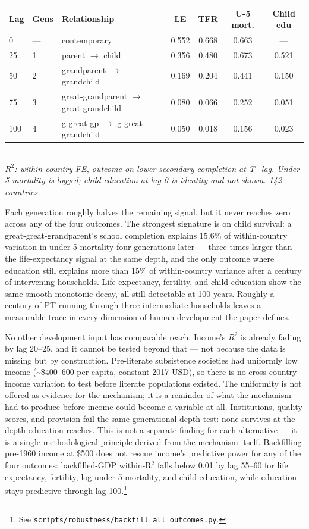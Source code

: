 \documentclass[12pt,letterpaper]{article}
\begin{document}
\begin{center}
\footnotesize
\begin{tabular}{@{}llp{4.4cm}cccc@{}}
\toprule
Lag & Gens & Relationship & LE & TFR & U-5 mort. & Child edu \\
\midrule
0   & ---  & contemporary                                 & 0.552 & 0.668 & 0.663 & --- \\
25  & 1    & parent $\to$ child                           & 0.356 & 0.480 & 0.673 & 0.521 \\
50  & 2    & grandparent $\to$ grandchild                 & 0.169 & 0.204 & 0.441 & 0.150 \\
75  & 3    & great-grandparent $\to$ great-grandchild     & 0.080 & 0.066 & 0.252 & 0.051 \\
100 & 4    & g-great-gp $\to$ g-great-grandchild          & 0.050 & 0.018 & 0.156 & 0.023 \\
\bottomrule
\end{tabular}\\
\textit{$R^2$: within-country FE, outcome on lower secondary completion
at T$-$lag. Under-5 mortality is logged; child education at lag 0 is
identity and not shown. 142 countries.}
\end{center}

Each generation roughly halves the remaining signal, but it never
reaches zero across any of the four outcomes. The strongest signature
is on child survival: a great-great-grandparent's school completion
explains 15.6\% of within-country variation in under-5 mortality four
generations later --- three times larger than the life-expectancy
signal at the same depth, and the only outcome where education still
explains more than 15\% of within-country variance after a century of
intervening households. Life expectancy, fertility, and child education
show the same smooth monotonic decay, all still detectable at 100
years. Roughly a century of PT running through three intermediate
households leaves a measurable trace in every dimension of human
development the paper defines.

No other development input has comparable reach. Income's $R^2$ is
already fading by lag 20--25, and it cannot be tested beyond that
--- not because the data is missing but by construction. Pre-literate
subsistence societies had uniformly low income
(\textasciitilde\$400--600 per capita, constant 2017 USD), so there is
no cross-country income variation to test before literate populations
existed. The uniformity is not offered as evidence for the mechanism;
it is a reminder of what the mechanism had to produce before income
could become a variable at all. Institutions, quality scores, and
provision fail the same generational-depth test: none survives at the
depth education reaches. This is not a separate finding for each
alternative --- it is a single methodological principle derived from
the mechanism itself. Backfilling pre-1960 income at \$500 does not
rescue income's predictive power for any of the four outcomes:
backfilled-GDP within-R$^2$ falls below 0.01 by lag 55--60 for life
expectancy, fertility, log under-5 mortality, and child education,
while education stays predictive through lag 100.\footnote{See
\texttt{scripts/robustness/backfill\_all\_outcomes.py}.}
\end{document}
